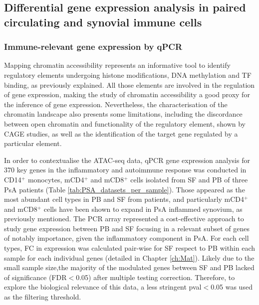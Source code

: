 


\subsection{Differential gene expression analysis in paired circulating and synovial immune cells}

\subsubsection{Immune-relevant gene expression by qPCR}
Mapping chromatin accessibility represents an informative tool to identify regulatory elements undergoing histone modifications, DNA methylation and TF binding, as previously explained. All those elements are involved in the regulation of gene expression, making the study of chromatin accessibility a good proxy for the inference of gene expression. Nevertheless, the characterisation of the chromatin landscape also presents some limitations, including the discordance between open chromatin and functionality of the regulatory element, shown by CAGE studies, as well as the identification of the target gene regulated by a particular element. 

In order to contextualise the ATAC-seq data, qPCR gene expression analysis for 370 key genes in the inflammatory and autoimmune response was conducted in CD14$^+$ monocytes, mCD4$^+$ and mCD8$^+$ cells isolated from SF and PB of three PsA patients (Table \ref{tab:PSA_datasets_per_sample}). Those appeared as the most abundant cell types in PB and SF from patients, and particularly mCD4$^+$ and mCD8$^+$ cells have been shown to expand in PsA inflammed synovium, as previously mentioned. The PCR array represented a cost-effective approach to study gene expression between PB and SF focusing in a relevant subset of genes of notably importance, given the inflammatory component in PsA. For each cell types, FC in expression was calculated pair-wise for SF respect to PB within each sample for each individual genes (detailed in Chapter \ref{ch:Mat}). Likely due to the small sample size,the majority of the modulated genes between SF and PB lacked of significance (FDR$<$0.05) after multiple testing correction. Therefore, to explore the biological relevance of this data, a less stringent pval$<$0.05 was used as the filtering threshold. 

